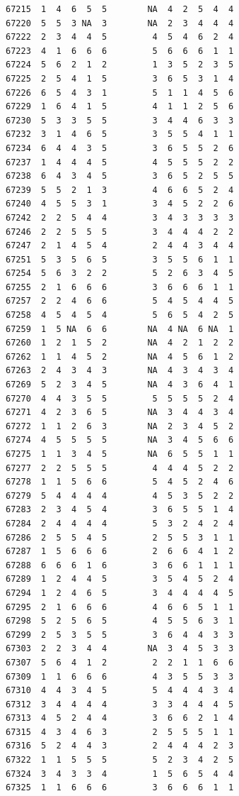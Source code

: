 \documentclass[
  letterpaper,
  DIV=11,
  numbers=noendperiod]{scrreprt}
\begin{document}
\begin{verbatim}
67215  1  4  6  5  5        NA  4  2  5  4  4
67220  5  5  3 NA  3        NA  2  3  4  4  4
67222  2  3  4  4  5         4  5  4  6  2  4
67223  4  1  6  6  6         5  6  6  6  1  1
67224  5  6  2  1  2         1  3  5  2  3  5
67225  2  5  4  1  5         3  6  5  3  1  4
67226  6  5  4  3  1         5  1  1  4  5  6
67229  1  6  4  1  5         4  1  1  2  5  6
67230  5  3  3  5  5         3  4  4  6  3  3
67232  3  1  4  6  5         3  5  5  4  1  1
67234  6  4  4  3  5         3  6  5  5  2  6
67237  1  4  4  4  5         4  5  5  5  2  2
67238  6  4  3  4  5         3  6  5  2  5  5
67239  5  5  2  1  3         4  6  6  5  2  4
67240  4  5  5  3  1         3  4  5  2  2  6
67242  2  2  5  4  4         3  4  3  3  3  3
67246  2  2  5  5  5         3  4  4  4  2  2
67247  2  1  4  5  4         2  4  4  3  4  4
67251  5  3  5  6  5         3  5  5  6  1  1
67254  5  6  3  2  2         5  2  6  3  4  5
67255  2  1  6  6  6         3  6  6  6  1  1
67257  2  2  4  6  6         5  4  5  4  4  5
67258  4  5  4  5  4         5  6  5  4  2  5
67259  1  5 NA  6  6        NA  4 NA  6 NA  1
67260  1  2  1  5  2        NA  4  2  1  2  2
67262  1  1  4  5  2        NA  4  5  6  1  2
67263  2  4  3  4  3        NA  4  3  4  3  4
67269  5  2  3  4  5        NA  4  3  6  4  1
67270  4  4  3  5  5         5  5  5  5  2  4
67271  4  2  3  6  5        NA  3  4  4  3  4
67272  1  1  2  6  3        NA  2  3  4  5  2
67274  4  5  5  5  5        NA  3  4  5  6  6
67275  1  1  3  4  5        NA  6  5  5  1  1
67277  2  2  5  5  5         4  4  4  5  2  2
67278  1  1  5  6  6         5  4  5  2  4  6
67279  5  4  4  4  4         4  5  3  5  2  2
67283  2  3  4  5  4         3  6  5  5  1  4
67284  2  4  4  4  4         5  3  2  4  2  4
67286  2  5  5  4  5         2  5  5  3  1  1
67287  1  5  6  6  6         2  6  6  4  1  2
67288  6  6  6  1  6         3  6  6  1  1  1
67289  1  2  4  4  5         3  5  4  5  2  4
67294  1  2  4  6  5         3  4  4  4  4  5
67295  2  1  6  6  6         4  6  6  5  1  1
67298  5  2  5  6  5         4  5  5  6  3  1
67299  2  5  3  5  5         3  6  4  4  3  3
67303  2  2  3  4  4        NA  3  4  5  3  3
67307  5  6  4  1  2         2  2  1  1  6  6
67309  1  1  6  6  6         4  3  5  5  3  3
67310  4  4  3  4  5         5  4  4  4  3  4
67312  3  4  4  4  4         3  3  4  4  4  5
67313  4  5  2  4  4         3  6  6  2  1  4
67315  4  3  4  6  3         2  5  5  5  1  1
67316  5  2  4  4  3         2  4  4  4  2  3
67322  1  1  5  5  5         5  2  3  4  2  5
67324  3  4  3  3  4         1  5  6  5  4  4
67325  1  1  6  6  6         3  6  6  6  1  1

\end{verbatim}
\end{document}
